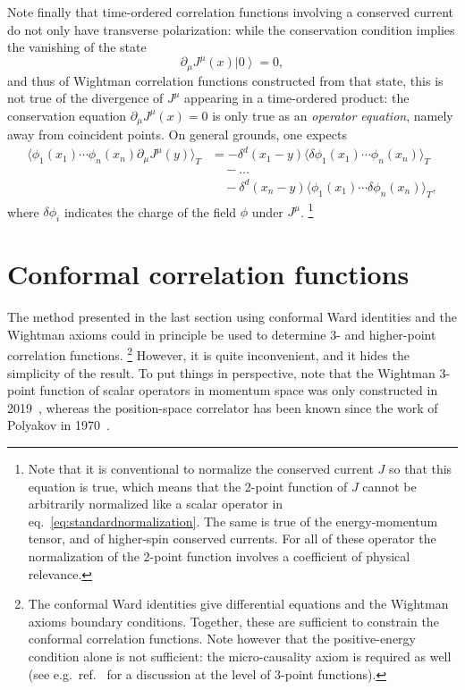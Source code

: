 \documentclass[a4paper,12pt]{article}
\newcommand{\ket}[1]{\left| #1 \right\rangle}
\numberwithin{equation}{section}
\begin{document}
Note finally that time-ordered correlation functions involving a conserved current do not only have transverse polarization: while the conservation condition implies the vanishing of the state
\begin{equation}
	\partial_\mu J^\mu(x) \ket{0} = 0,
\end{equation}
and thus of Wightman correlation functions constructed from that state, this is not true of the divergence of $J^\mu$ appearing in a time-ordered product: the conservation equation $\partial_\mu J^\mu(x) = 0$ is only true as an \emph{operator equation}, namely away from coincident points. On general grounds, one expects
\begin{align}
	\langle \phi_1(x_1) \cdots \phi_n(x_n)
	\partial_\mu J^\mu(y) \rangle_T
	&= - \delta^d(x_1 - y)
	\langle \delta\phi_1(x_1) \cdots \phi_n(x_n)  \rangle_T
	\nonumber \\
	& \quad - \ldots
	\nonumber \\
	& \quad -\delta^d(x_n - y)
	\langle \phi_1(x_1) \cdots \delta\phi_n(x_n)  \rangle_T,
\end{align}
where $\delta\phi_i$ indicates the charge of the field $\phi$ under $J^\mu$.%
%
\footnote{Note that it is conventional to normalize the conserved current $J$ so that this equation is true, which means that the 2-point function of $J$ cannot be arbitrarily normalized like a scalar operator in eq.~\eqref{eq:standardnormalization}. The same is true of the energy-momentum tensor, and of higher-spin conserved currents. For all of these operator the normalization of the 2-point function involves a coefficient of physical relevance.}




\section{Conformal correlation functions}
\label{sec:correlators}

The method presented in the last section using conformal Ward identities and the Wightman axioms could in principle be used to determine 3- and higher-point correlation functions.%
%
\footnote{The conformal Ward identities give differential equations and the Wightman axioms boundary conditions. Together, these are sufficient to constrain the conformal correlation functions. Note however that the positive-energy condition alone is not sufficient: the micro-causality axiom is required as well (see e.g.~ref.~\cite{Gillioz:2021sce} for a discussion at the level of 3-point functions).}
%
However, it is quite inconvenient, and it hides the simplicity of the result. To put things in perspective, note that the Wightman 3-point function of scalar operators in momentum space was only constructed in 2019~\cite{Gillioz:2019lgs}, whereas the position-space correlator has been known since the work of Polyakov in 1970~\cite{Polyakov:1970xd}.
\end{document}
